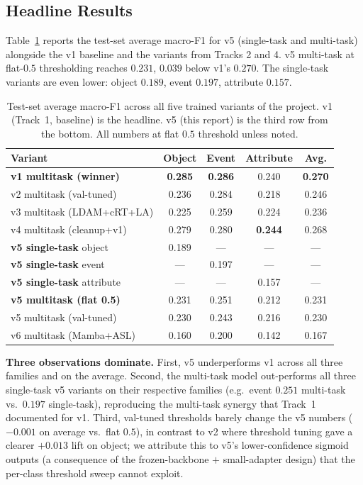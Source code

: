 \documentclass[journal]{IEEEtran}
\begin{document}
\subsection{Headline Results}\label{ssec:headline}

Table~\ref{tab:main} reports the test-set average macro-F1 for v5 (single-task and multi-task) alongside the v1 baseline and the variants from Tracks 2 and 4. v5 multi-task at flat-$0.5$ thresholding reaches $0.231$, $0.039$ below v1's $0.270$. The single-task variants are even lower: object $0.189$, event $0.197$, attribute $0.157$.

\begin{table}[!t]
  \caption{Test-set average macro-F1 across all five trained variants of the project. v1 (Track~1, baseline) is the headline. v5 (this report) is the third row from the bottom. All numbers at flat $0.5$ threshold unless noted.}
  \label{tab:main}
  \centering
  \small
  \begin{tabular}{@{}lcccc@{}}
  \toprule
  Variant & Object & Event & Attribute & \textbf{Avg.} \\
  \midrule
  \textbf{v1 multitask (winner)}  & \textbf{0.285} & \textbf{0.286} & 0.240 & \textbf{0.270} \\
  v2 multitask (val-tuned)        & 0.236 & 0.284 & 0.218 & 0.246 \\
  v3 multitask (LDAM+cRT+LA)      & 0.225 & 0.259 & 0.224 & 0.236 \\
  v4 multitask (cleanup+v1)       & 0.279 & 0.280 & \textbf{0.244} & 0.268 \\
  \midrule
  \textbf{v5 single-task} object  & 0.189 & --- & --- & --- \\
  \textbf{v5 single-task} event   & --- & 0.197 & --- & --- \\
  \textbf{v5 single-task} attribute & --- & --- & 0.157 & --- \\
  \textbf{v5 multitask (flat 0.5)} & 0.231 & 0.251 & 0.212 & 0.231 \\
  v5 multitask (val-tuned)        & 0.230 & 0.243 & 0.216 & 0.230 \\
  \midrule
  v6 multitask (Mamba+ASL)        & 0.160 & 0.200 & 0.142 & 0.167 \\
  \bottomrule
  \end{tabular}
\end{table}

\textbf{Three observations dominate.} First, v5 underperforms v1 across all three families and on the average. Second, the multi-task model out-performs all three single-task v5 variants on their respective families (e.g.\ event $0.251$ multi-task vs.\ $0.197$ single-task), reproducing the multi-task synergy that Track~1 documented for v1. Third, val-tuned thresholds barely change the v5 numbers ($-0.001$ on average vs.\ flat $0.5$), in contrast to v2 where threshold tuning gave a clearer $+0.013$ lift on object; we attribute this to v5's lower-confidence sigmoid outputs (a consequence of the frozen-backbone $+$ small-adapter design) that the per-class threshold sweep cannot exploit.
\end{document}
